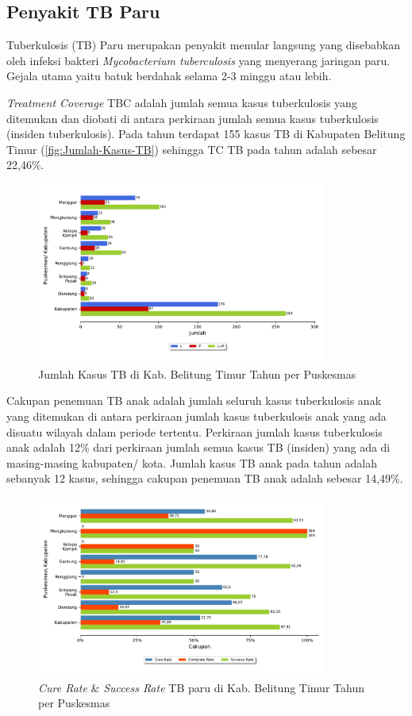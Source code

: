 \subsection{Penyakit TB Paru}
Tuberkulosis (TB) Paru merupakan penyakit menular langsung yang disebabkan oleh infeksi bakteri \emph{Mycobacterium tuberculosis} yang menyerang jaringan paru. Gejala utama yaitu batuk berdahak selama 2-3 minggu atau lebih.

\emph{Treatment Coverage} TBC adalah jumlah semua kasus tuberkulosis yang ditemukan dan diobati di antara perkiraan jumlah semua kasus tuberkulosis (insiden
tuberkulosis). Pada tahun \tP terdapat 155 kasus TB di Kabupaten Belitung Timur (\autoref{fig:Jumlah-Kasus-TB}) sehingga TC TB pada tahun \tP adalah sebesar 22,46\%.

\begin{figure}[H]
  \centering
  \includegraphics[width=0.85\textwidth]{bab_06/bab_06_01a_kasusTB}
  \caption{Jumlah Kasus TB di Kab. Belitung Timur Tahun \tP per Puskesmas}
  \label{fig:Jumlah-Kasus-TB}
\end{figure}

Cakupan penemuan TB anak adalah jumlah seluruh kasus tuberkulosis anak yang ditemukan di antara perkiraan jumlah kasus tuberkulosis anak yang ada disuatu wilayah dalam periode tertentu. Perkiraan jumlah kasus tuberkulosis  anak adalah 12\% dari perkiraan jumlah semua kasus TB (insiden) yang ada di masing-masing kabupaten/ kota. Jumlah kasus TB anak pada tahun \tP adalah sebanyak 12 kasus, sehingga cakupan penemuan TB anak adalah sebesar 14,49\%.

\begin{figure}[H]
    \centering
    \includegraphics[width=0.85\textwidth]{bab_06/bab_06_01b_cureCompSuccRateTB}
    \caption{\emph{Cure Rate} \& \emph{Success Rate} TB paru di Kab. Belitung Timur Tahun \tP per Puskesmas}
    \label{fig:Cure-Rate-TB}
\end{figure}

